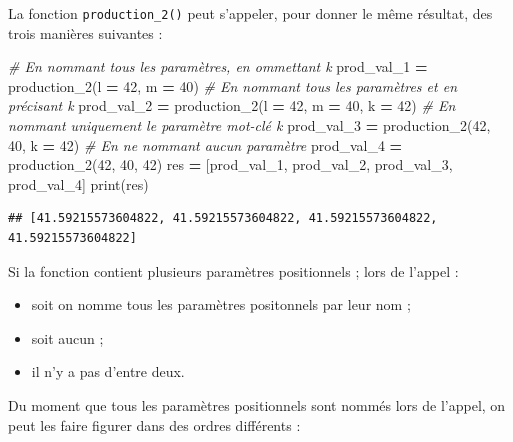 \documentclass[12pt,]{book}
\newenvironment{Shaded}{\begin{snugshade}}{\end{snugshade}}
\newcommand{\DecValTok}[1]{\textcolor[rgb]{0.00,0.00,0.81}{#1}}
\newcommand{\CommentTok}[1]{\textcolor[rgb]{0.56,0.35,0.01}{\textit{#1}}}
\newcommand{\OperatorTok}[1]{\textcolor[rgb]{0.81,0.36,0.00}{\textbf{#1}}}
\newcommand{\BuiltInTok}[1]{#1}
\newcommand{\NormalTok}[1]{#1}
\providecommand{\tightlist}{%
  \setlength{\itemsep}{0pt}\setlength{\parskip}{0pt}}
\numberwithin{equation}{section}
\numberwithin{countremarque}{section}
\let\BeginKnitrBlock\begin \let\EndKnitrBlock\end
\begin{document}
La fonction \texttt{production\_2()} peut s'appeler, pour donner le même
résultat, des trois manières suivantes :

\begin{Shaded}
\begin{Highlighting}[]
\CommentTok{# En nommant tous les paramètres, en ommettant k}
\NormalTok{prod_val_1 }\OperatorTok{=}\NormalTok{ production_2(l }\OperatorTok{=} \DecValTok{42}\NormalTok{, m }\OperatorTok{=} \DecValTok{40}\NormalTok{)}
\CommentTok{# En nommant tous les paramètres et en précisant k}
\NormalTok{prod_val_2 }\OperatorTok{=}\NormalTok{ production_2(l }\OperatorTok{=} \DecValTok{42}\NormalTok{, m }\OperatorTok{=} \DecValTok{40}\NormalTok{, k }\OperatorTok{=} \DecValTok{42}\NormalTok{)}
\CommentTok{# En nommant uniquement le paramètre mot-clé k}
\NormalTok{prod_val_3 }\OperatorTok{=}\NormalTok{ production_2(}\DecValTok{42}\NormalTok{, }\DecValTok{40}\NormalTok{, k }\OperatorTok{=} \DecValTok{42}\NormalTok{)}
\CommentTok{# En ne nommant aucun paramètre}
\NormalTok{prod_val_4 }\OperatorTok{=}\NormalTok{ production_2(}\DecValTok{42}\NormalTok{, }\DecValTok{40}\NormalTok{, }\DecValTok{42}\NormalTok{)}
\NormalTok{res }\OperatorTok{=}\NormalTok{ [prod_val_1, prod_val_2, prod_val_3, prod_val_4]}
\BuiltInTok{print}\NormalTok{(res)}
\end{Highlighting}
\end{Shaded}

\begin{lstlisting}
## [41.59215573604822, 41.59215573604822, 41.59215573604822, 41.59215573604822]
\end{lstlisting}

\BeginKnitrBlock{remarque}
Si la fonction contient plusieurs paramètres positionnels ; lors de
l'appel :

\begin{itemize}
\tightlist
\item
  soit on nomme tous les paramètres positonnels par leur nom ;
\item
  soit aucun ;
\item
  il n'y a pas d'entre deux.
\end{itemize}
\EndKnitrBlock{remarque}

Du moment que tous les paramètres positionnels sont nommés lors de
l'appel, on peut les faire figurer dans des ordres différents :
\end{document}
